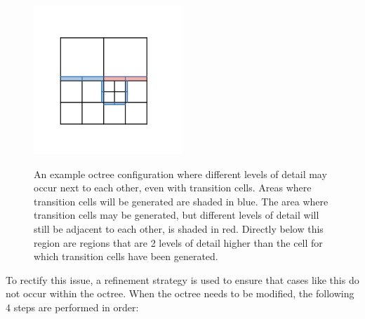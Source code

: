 \documentclass{article}
\begin{document}
\begin{figure}
  \caption{An example octree configuration where different levels of detail may occur next to each other, even with transition cells. Areas where transition cells will be generated are shaded in blue. The area where transition cells may be generated, but different levels of detail will still be adjacent to each other, is shaded in red. Directly below this region are regions that are 2 levels of detail higher than the cell for which transition cells have been generated.}
  \includegraphics[width=0.5\textwidth]{octree_neighbor_error.png}
  \label{fig:octree_neighbor_error}
\end{figure}
To rectify this issue, a refinement strategy is used to ensure that cases like this do not occur within the octree. When the octree needs to be modified, the following 4 steps are performed in order:
\end{document}
